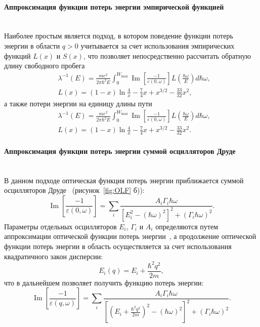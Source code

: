 \paragraph{Аппроксимация функции потерь энергии эмпирической функцией} \mbox{} \\
\indent Наиболее простым является подход, в котором поведение функции потерь энергии в области $q > 0$ учитывается за счет использования эмпирических функций $L(x)$ и $S(x)$, что позволяет непосредственно рассчитать обратную длину свободного пробега~\cite{Ashley_LxSx}
\begin{equation}
	\begin{aligned}
		&\lambda^{-1}(E)=\frac{m e^2}{2 \pi \hbar^2 E} \int_0^{W_{\max }} \operatorname{Im}\left[\frac{-1}{\varepsilon(0, \omega)}\right] L\left(\frac{\hbar \omega}{E}\right) d \hbar \omega, \\
		&L(x)=(1-x) \ln \frac{4}{x}-\frac{7}{4} x+x^{3 / 2}-\frac{33}{32} x^2,
	\end{aligned}
\end{equation}
а также потери энергии на единицу длины пути
\begin{equation}
	\begin{aligned}
		&\lambda^{-1}(E)=\frac{m e^2}{2 \pi \hbar^2 E} \int_0^{W_{\max }} \operatorname{Im}\left[\frac{-1}{\varepsilon(0, \omega)}\right] L\left(\frac{\hbar \omega}{E}\right) d \hbar \omega, \\
		&L(x)=(1-x) \ln \frac{4}{x}-\frac{7}{4} x+x^{3 / 2}-\frac{33}{32} x^2.
	\end{aligned}
\end{equation}



\paragraph{Аппроксимация функции потерь энергии суммой осцилляторов Друде} \mbox{} \\
\indent В данном подходе оптическая функция потерь энергии приближается суммой осцилляторов Друде~\cite{Ritchie_Drude} (рисунок~\ref{fig:OLF} б)):
\begin{equation}
	\operatorname{Im}\left[\frac{-1}{\varepsilon(0, \omega)}\right]=\sum_i \frac{A_i \Gamma_i \hbar \omega}{\left[E_i^2-(\hbar \omega)^2\right]^2+\left(\Gamma_i \hbar \omega\right)^2}.
\end{equation}
Параметры отдельных осцилляторов $E_i$, $\Gamma_i$ и $A_i$ определяются путем аппроксимации оптической функции потерь энергии~\cite{Dapor_2015_oscillators}, а продолжение оптической функции потерь энергии в область осуществляется за счет использования квадратичного закон дисперсии:
\begin{equation}
	E_i(q)=E_i+\frac{\hbar^2 q^2}{2 m},
\end{equation}
что в дальнейшем позволяет получить функцию потерь энергии:
\begin{equation}
	\operatorname{Im}\left[\frac{-1}{\varepsilon(q, \omega)}\right]=\sum_i \frac{A_i \Gamma_i \hbar \omega}{\left[\left(E_i+\frac{\hbar^2 q^2}{2 m}\right)^2-(\hbar \omega)^2\right]^2+\left(\Gamma_i \hbar \omega\right)^2}.
\end{equation}


